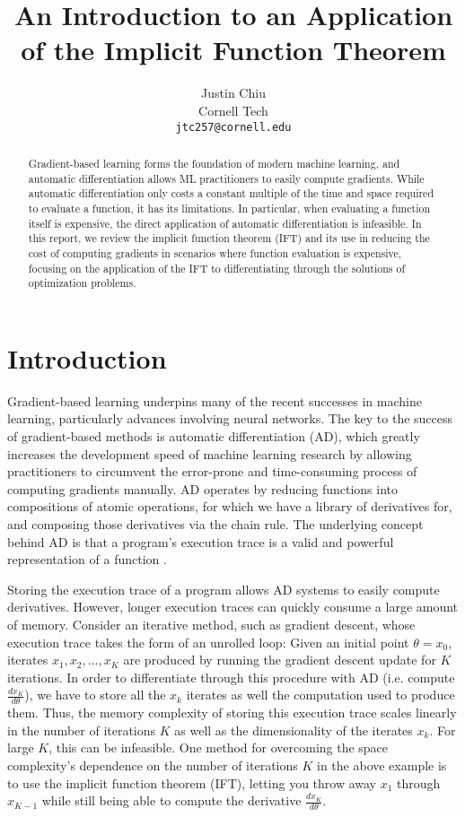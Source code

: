 \documentclass[11pt]{article}
\title{An Introduction to an Application of the Implicit Function Theorem}
\author{Justin Chiu \\
  Cornell Tech \\
  \texttt{jtc257@cornell.edu}}
\begin{document}
\maketitle
\begin{abstract}
Gradient-based learning forms the foundation of modern machine learning,
and automatic differentiation allows ML practitioners to easily compute gradients.
While automatic differentiation only costs a constant multiple of the time and space
required to evaluate a function, it has its limitations.
In particular, when evaluating a function itself is expensive,
the direct application of automatic differentiation is infeasible.
In this report, we review the implicit function theorem (IFT)
and its use in reducing the cost of computing gradients in scenarios where
function evaluation is expensive,
focusing on the application of the IFT to differentiating
through the solutions of optimization problems.
\end{abstract}

\section{Introduction}
\label{sec:intro}
Gradient-based learning underpins many of the recent successes in machine learning,
particularly advances involving neural networks.
The key to the success of gradient-based methods is automatic differentiation (AD),
which greatly increases the development speed of machine learning research by
allowing practitioners to circumvent the error-prone and time-consuming process
of computing gradients manually.
AD operates by reducing functions into compositions of atomic operations,
for which we have a library of derivatives for,
and composing those derivatives via the chain rule.
The underlying concept behind AD is that a program's execution trace is a valid
and powerful representation of a function \citep{griewank2008autodiff}.

Storing the execution trace of a program allows AD systems to easily compute derivatives.
However, longer execution traces can quickly consume a large amount of memory.
Consider an iterative method, such as gradient descent,
whose execution trace takes the form of an unrolled loop:
Given an initial point $\theta = x_0$,
iterates $x_1, x_2, ..., x_{K}$ are produced by running the gradient descent
update for $K$ iterations.
In order to differentiate through this procedure with AD
(i.e. compute $\frac{dx_K}{d\theta}$),
we have to store all the $x_k$ iterates
as well the computation used to produce them.
Thus, the memory complexity of storing this execution trace scales linearly in the
number of iterations $K$ as well as the dimensionality of the iterates $x_k$.
For large $K$, this can be infeasible.
One method for overcoming the space complexity's dependence on the number of iterations $K$ in
the above example is to use the implicit function theorem (IFT),
letting you throw away $x_1$ through $x_{K-1}$
while still being able to compute the derivative $\frac{dx_{K}}{d\theta}$.
\end{document}
